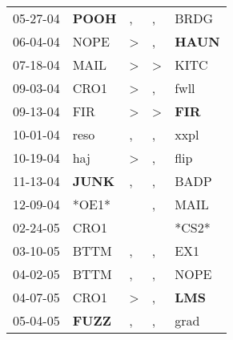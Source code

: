 \begin{supertabular}{p{0.07\textwidth}p{0.06\textwidth}p{0.02\textwidth}p{0.02\textwidth}p{0.06\textwidth}}
          05-27-04\textsuperscript{} &  \textbf{POOH\textsuperscript{}} &                , &                , &           BRDG\textsuperscript{} \\
          06-04-04\textsuperscript{} &           NOPE\textsuperscript{} &     \textgreater &                , &  \textbf{HAUN\textsuperscript{}} \\
          07-18-04\textsuperscript{} &           MAIL\textsuperscript{} &     \textgreater &     \textgreater &           KITC\textsuperscript{} \\
          09-03-04\textsuperscript{} &           CRO1\textsuperscript{} &     \textgreater &                , &           fwll\textsuperscript{} \\
          09-13-04\textsuperscript{} &            FIR\textsuperscript{} &     \textgreater &     \textgreater &   \textbf{FIR\textsuperscript{}} \\
          10-01-04\textsuperscript{} &           reso\textsuperscript{} &                , &                , &           xxpl\textsuperscript{} \\
          10-19-04\textsuperscript{} &            haj\textsuperscript{} &     \textgreater &                , &           flip\textsuperscript{} \\
          11-13-04\textsuperscript{} &  \textbf{JUNK\textsuperscript{}} &                , &                , &           BADP\textsuperscript{} \\
          12-09-04\textsuperscript{} &                            *OE1* &                  &                , &           MAIL\textsuperscript{} \\
          02-24-05\textsuperscript{} &           CRO1\textsuperscript{} &                  &                  &                            *CS2* \\
          03-10-05\textsuperscript{} &           BTTM\textsuperscript{} &                , &                , &            EX1\textsuperscript{} \\
          04-02-05\textsuperscript{} &           BTTM\textsuperscript{} &                , &                , &           NOPE\textsuperscript{} \\
          04-07-05\textsuperscript{} &           CRO1\textsuperscript{} &     \textgreater &                , &   \textbf{LMS\textsuperscript{}} \\
          05-04-05\textsuperscript{} &  \textbf{FUZZ\textsuperscript{}} &                , &                , &           grad\textsuperscript{} \\

\end{supertabular}
